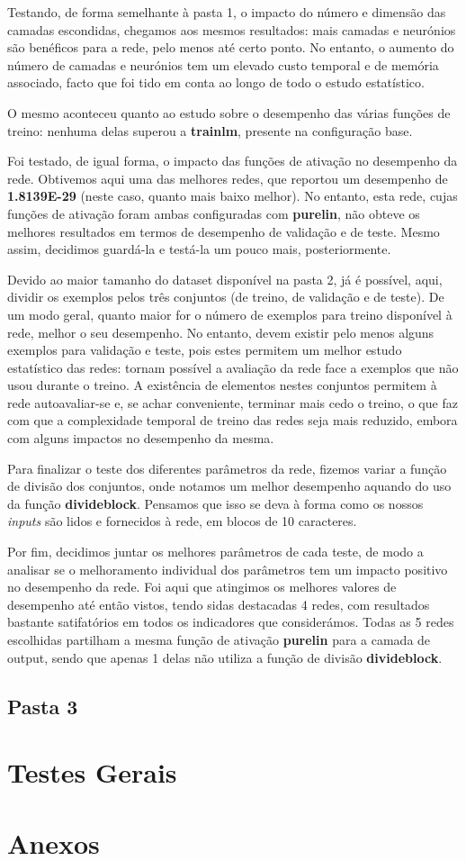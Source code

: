 \documentclass[11pt]{article}
\begin{document}
	Testando, de forma semelhante à pasta 1, o impacto do número e dimensão das camadas escondidas, chegamos aos mesmos resultados: mais camadas e neurónios são benéficos para a rede, pelo menos até certo ponto. No entanto, o aumento do número de camadas e neurónios tem um elevado custo temporal e de memória associado, facto que foi tido em conta ao longo de todo o estudo estatístico.
	
	O mesmo aconteceu quanto ao estudo sobre o desempenho das várias funções de treino: nenhuma delas superou a \textbf{trainlm}, presente na configuração base.
	
	Foi testado, de igual forma, o impacto das funções de ativação no desempenho da rede. Obtivemos aqui uma das melhores redes, que reportou um desempenho de \textbf{1.8139E-29} (neste caso, quanto mais baixo melhor). No entanto, esta rede, cujas funções de ativação foram ambas configuradas com \textbf{purelin}, não obteve os melhores resultados em termos de desempenho de validação e de teste. Mesmo assim, decidimos guardá-la e testá-la um pouco mais, posteriormente.
	
	Devido ao maior tamanho do dataset disponível na pasta 2, já é possível, aqui, dividir os exemplos pelos três conjuntos (de treino, de validação e de teste). De um modo geral, quanto maior for o número de exemplos para treino disponível à rede, melhor o seu desempenho. No entanto, devem existir pelo menos alguns exemplos para validação e teste, pois estes permitem um melhor estudo estatístico das redes: tornam possível a avaliação da rede face a exemplos que não usou durante o treino. A existência de elementos nestes conjuntos permitem à rede autoavaliar-se e, se achar conveniente, terminar mais cedo o treino, o que faz com que a complexidade temporal de treino das redes seja mais reduzido, embora com alguns impactos no desempenho da mesma.
	
	Para finalizar o teste dos diferentes parâmetros da rede, fizemos variar a função de divisão dos conjuntos, onde notamos um melhor desempenho aquando do uso da função \textbf{divideblock}. Pensamos que isso se deva à forma como os nossos \textit{inputs} são lidos e fornecidos à rede, em blocos de 10 caracteres.
	
	Por fim, decidimos juntar os melhores parâmetros de cada teste, de modo a analisar se o melhoramento individual dos parâmetros tem um impacto positivo no desempenho da rede. Foi aqui que atingimos os melhores valores de desempenho até então vistos, tendo sidas destacadas 4 redes, com resultados bastante satifatórios em todos os indicadores que considerámos. Todas as 5 redes escolhidas partilham a mesma função de ativação \textbf{purelin} para a camada de output, sendo que apenas 1 delas não utiliza a função de divisão \textbf{divideblock}.
	
	\pagebreak
	
	\large
	\subsection{Pasta 3}
	\normalsize
	
	
	\large
	\section{Testes Gerais}
	\normalsize

	\large
	\section{Anexos}

	\normalsize
	\listoffigures
\end{document}
